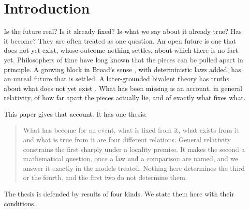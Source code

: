 \documentclass[11pt]{article}
\theoremstyle{definition}
\begin{document}
\tableofcontents

\section{Introduction}\label{sec:intro}

Is the future real? Is it already fixed? Is what we say about it already true?
Has it become? They are often treated as one question. An open future
is one that does not yet exist, whose outcome nothing settles, about which there
is no fact yet. Philosophers of time have long known that the pieces can be
pulled apart in principle. A growing block in Broad's sense \citep{Broad1923}, with deterministic laws added, has an unreal future that is settled. A later-grounded bivalent theory has
truths about what does not yet exist \citep{CR2018}. What has been missing is an
account, in general relativity, of how far apart the pieces actually lie, and of
exactly what fixes what.

This paper gives that account. It has one thesis:
\begin{quote}
What has become for an event, what is fixed from it, what exists from it and what
is true from it are four different relations. General relativity constrains the
first sharply under a locality premise. It makes the second a mathematical question, once a law and a comparison are named, and we answer it exactly in the models treated. Nothing here determines the third or the fourth, and the first two do not determine them.
\end{quote}

The thesis is defended by results of four kinds. We state them here with their
conditions.
\end{document}
